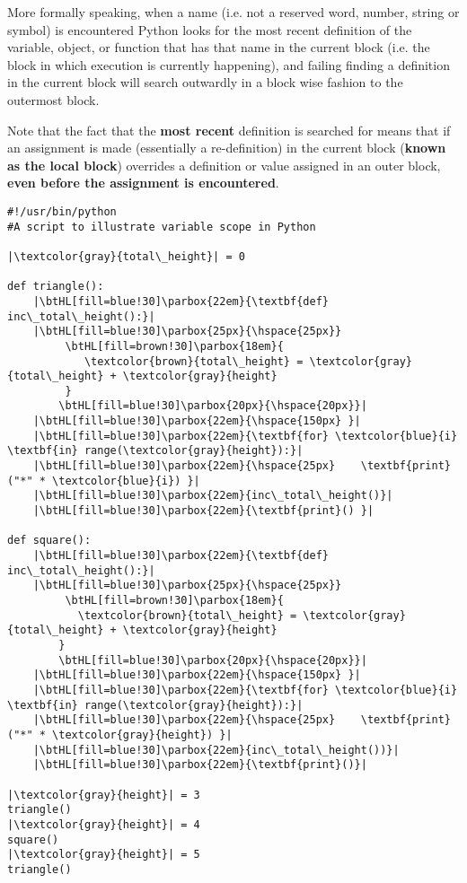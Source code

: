 More formally speaking,   when a name (i.e. not a reserved word, number, string or symbol) is   encountered Python looks for the most recent definition of the   variable, object, or function that has that name in the current block   (i.e. the block in which execution is currently happening), and failing   finding a definition in the current block will search outwardly in a   block wise fashion to the outermost block.

Note that the fact that the \textbf{most recent} definition   is searched for means that if an assignment is made (essentially a   re-definition) in the current block (\textbf{known as the local   block}) overrides a definition or value assigned in an outer   block, \textbf{even before the assignment is encountered}. \\

\begin{lstlisting}[mathescape,escapechar=|]
#!/usr/bin/python 
#A script to illustrate variable scope in Python 

|\textcolor{gray}{total\_height}| = 0

def triangle(): 
    |\btHL[fill=blue!30]\parbox{22em}{\textbf{def} inc\_total\_height():}|
    |\btHL[fill=blue!30]\parbox{25px}{\hspace{25px}}
         \btHL[fill=brown!30]\parbox{18em}{
            \textcolor{brown}{total\_height} = \textcolor{gray}{total\_height} + \textcolor{gray}{height}
         }
        \btHL[fill=blue!30]\parbox{20px}{\hspace{20px}}|
    |\btHL[fill=blue!30]\parbox{22em}{\hspace{150px} }|
    |\btHL[fill=blue!30]\parbox{22em}{\textbf{for} \textcolor{blue}{i} \textbf{in} range(\textcolor{gray}{height}):}|
    |\btHL[fill=blue!30]\parbox{22em}{\hspace{25px}    \textbf{print}("*" * \textcolor{blue}{i}) }|
    |\btHL[fill=blue!30]\parbox{22em}{inc\_total\_height()}|
    |\btHL[fill=blue!30]\parbox{22em}{\textbf{print}() }|

def square():
    |\btHL[fill=blue!30]\parbox{22em}{\textbf{def} inc\_total\_height():}|
    |\btHL[fill=blue!30]\parbox{25px}{\hspace{25px}}
         \btHL[fill=brown!30]\parbox{18em}{
           \textcolor{brown}{total\_height} = \textcolor{gray}{total\_height} + \textcolor{gray}{height}
        }
        \btHL[fill=blue!30]\parbox{20px}{\hspace{20px}}|
    |\btHL[fill=blue!30]\parbox{22em}{\hspace{150px} }|
    |\btHL[fill=blue!30]\parbox{22em}{\textbf{for} \textcolor{blue}{i} \textbf{in} range(\textcolor{gray}{height}):}|
    |\btHL[fill=blue!30]\parbox{22em}{\hspace{25px}    \textbf{print}("*" * \textcolor{gray}{height}) }|
    |\btHL[fill=blue!30]\parbox{22em}{inc\_total\_height())}|
    |\btHL[fill=blue!30]\parbox{22em}{\textbf{print}()}| 

|\textcolor{gray}{height}| = 3
triangle()
|\textcolor{gray}{height}| = 4
square()
|\textcolor{gray}{height}| = 5
triangle()
\end{lstlisting}

